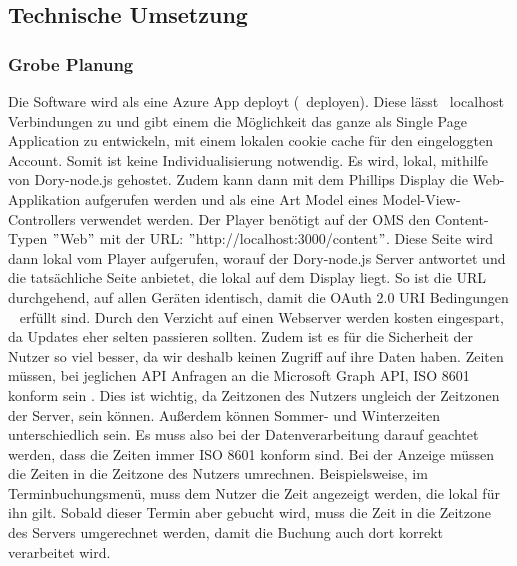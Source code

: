 
\subsection{Technische Umsetzung}\label{subsec:technische-umsetzung}

\subsubsection{Grobe Planung}
Die Software wird als eine Azure App deployt (~\gls{deployen}).
Diese lässt ~\gls{localhost} Verbindungen zu und gibt einem die Möglichkeit das ganze als Single Page Application zu entwickeln, mit einem lokalen cookie cache für den eingeloggten Account.
Somit ist keine Individualisierung notwendig.
\newline
Es wird, lokal, mithilfe von Dory-node.js gehostet.
Zudem kann dann mit dem Phillips Display die Web-Applikation aufgerufen werden und als eine Art Model eines Model-View-Controllers verwendet werden.
\newline
Der Player benötigt auf der OMS den Content-Typen \("\)Web\("\) mit der URL: \("\)http://localhost:3000/content\("\).
Diese Seite wird dann lokal vom Player aufgerufen, worauf der Dory-node.js Server antwortet und die tatsächliche Seite anbietet, die lokal auf dem Display liegt.
So ist die URL durchgehend, auf allen Geräten identisch, damit die OAuth 2.0 URI Bedingungen ~\cite{OAuth-2.0-Simplified} erfüllt sind.
Durch den Verzicht auf einen Webserver werden kosten eingespart, da Updates eher selten passieren sollten.
\newline
Zudem ist es für die Sicherheit der Nutzer so viel besser, da wir deshalb keinen Zugriff auf ihre Daten haben.
Zeiten müssen, bei jeglichen API Anfragen an die Microsoft Graph API, ISO 8601 konform sein \@.
Dies ist wichtig, da Zeitzonen des Nutzers ungleich der Zeitzonen der Server, sein können.
Außerdem können Sommer- und Winterzeiten unterschiedlich sein.
Es muss also bei der Datenverarbeitung darauf geachtet werden, dass die Zeiten immer ISO 8601 konform sind.
Bei der Anzeige müssen die Zeiten in die Zeitzone des Nutzers umrechnen.
Beispielsweise, im Terminbuchungsmenü, muss dem Nutzer die Zeit angezeigt werden, die lokal für ihn gilt.
Sobald dieser Termin aber gebucht wird, muss die Zeit in die Zeitzone des Servers umgerechnet werden, damit die Buchung auch dort korrekt verarbeitet wird.
\newline
\pagebreak
